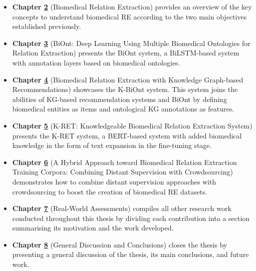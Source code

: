 \begin{itemize}
   \item \textbf{Chapter \hyperlink{2}{2}} (Biomedical Relation Extraction) provides an overview of the key concepts to understand biomedical RE according to the two main objectives established previously. 
   \item \textbf{Chapter \hyperlink{3}{3}} (BiOnt: Deep Learning Using Multiple Biomedical Ontologies for Relation Extraction) presents the BiOnt system, a BiLSTM-based system with annotation layers based on biomedical ontologies. 
   \item \textbf{Chapter \hyperlink{4}{4}} (Biomedical Relation Extraction with Knowledge Graph-based Recommendations) showcases the K-BiOnt system. This system joins the abilities of KG-based recommendation systems and BiOnt by defining biomedical entities as items and ontological KG annotations as features. 
   \item \textbf{Chapter \hyperlink{5}{5}} (K-RET: Knowledgeable Biomedical Relation Extraction System) presents the K-RET system, a BERT-based system with added biomedical knowledge in the form of text expansion in the fine-tuning stage. 
   \item \textbf{Chapter \hyperlink{6}{6}} (A Hybrid Approach toward Biomedical Relation Extraction Training Corpora: Combining Distant Supervision with Crowdsourcing) demonstrates how to combine distant supervision approaches with crowdsourcing to boost the creation of biomedical RE datasets. 
   \item \textbf{Chapter \hyperlink{7}{7}} (Real-World Assessments) compiles all other research work conducted throughout this thesis by dividing each contribution into a section summarising its motivation and the work developed. 
   \item \textbf{Chapter \hyperlink{8}{8}} (General Discussion and Conclusions) closes the thesis by presenting a general discussion of the thesis, its main conclusions, and future work.
\end{itemize}